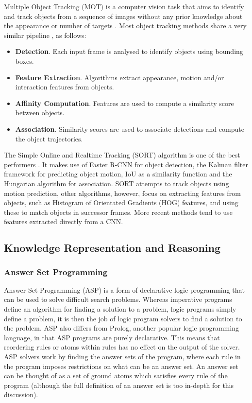\documentclass[../interim.tex]{subfiles}
\begin{document}
Multiple Object Tracking (MOT) is a computer vision task that aims to identify and track objects from a sequence of images without any prior knowledge about the appearance or number of targets \cite{obj-tracking-survey}. Most object tracking methods share a very similar pipeline \cite{obj-tracking-survey}, as follows:
\begin{itemize}
  \item \textbf{Detection}. Each input frame is analysed to identify objects using bounding boxes.

  \item \textbf{Feature Extraction}. Algorithms extract appearance, motion and/or interaction features from objects.

  \item \textbf{Affinity Computation}. Features are used to compute a similarity score between objects.

  \item \textbf{Association}. Similarity scores are used to associate detections and compute the object trajectories.
\end{itemize}

The Simple Online and Realtime Tracking (SORT) \cite{sort-obj-tracking} algorithm is one of the best performers \cite{obj-tracking-survey}. It makes use of Faster R-CNN for object detection, the Kalman filter \cite{kalman-filter} framework for predicting object motion, IoU as a similarity function and the Hungarian algorithm \cite{hungarian-algo} for association. SORT attempts to track objects using motion prediction, other algorithms, however, focus on extracting features from objects, such as Histogram of Orientated Gradients (HOG) \cite{hog-features} features, and using these to match objects in successor frames. More recent methods tend to use features extracted directly from a CNN.


\subsection{Knowledge Representation and Reasoning}

\subsubsection{Answer Set Programming}

Answer Set Programming (ASP) is a form of declarative logic programming that can be used to solve difficult search problems. Whereas imperative programs define an algorithm for finding a solution to a problem, logic programs simply define a problem, it is then the job of logic program solvers to find a solution to the problem. ASP also differs from Prolog, another popular logic programming language, in that ASP programs are purely declarative. This means that reordering rules or atoms within rules has no effect on the output of the solver\cite{asp-primer}. ASP solvers work by finding the answer sets of the program, where each rule in the program imposes restrictions on what can be an answer set. An answer set can be thought of as a set of ground atoms which satisfies every rule of the program (although the full definition of an answer set is too in-depth for this discussion).
\end{document}
